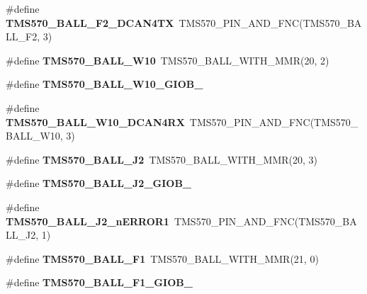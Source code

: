 \begin{DoxyCompactItemize}
\item 
\mbox{\label{tms570lc4357-pins_8h_a7022e9d881c8a7c5c00392f973da887c}} 
\#define {\bfseries T\+M\+S570\+\_\+\+B\+A\+L\+L\+\_\+\+F2\+\_\+\+D\+C\+A\+N4\+TX}~T\+M\+S570\+\_\+\+P\+I\+N\+\_\+\+A\+N\+D\+\_\+\+F\+NC(T\+M\+S570\+\_\+\+B\+A\+L\+L\+\_\+\+F2, 3)
\item 
\mbox{\label{tms570lc4357-pins_8h_af3fe649bd55fff8ad237671e7b23c7ab}} 
\#define {\bfseries T\+M\+S570\+\_\+\+B\+A\+L\+L\+\_\+\+W10}~T\+M\+S570\+\_\+\+B\+A\+L\+L\+\_\+\+W\+I\+T\+H\+\_\+\+M\+MR(20, 2)
\item 
\#define {\bfseries T\+M\+S570\+\_\+\+B\+A\+L\+L\+\_\+\+W10\+\_\+\+G\+I\+O\+B\+\_}
\item 
\mbox{\label{tms570lc4357-pins_8h_a6ebe5a0a27eb5fa7b3b431a7367dcf04}} 
\#define {\bfseries T\+M\+S570\+\_\+\+B\+A\+L\+L\+\_\+\+W10\+\_\+\+D\+C\+A\+N4\+RX}~T\+M\+S570\+\_\+\+P\+I\+N\+\_\+\+A\+N\+D\+\_\+\+F\+NC(T\+M\+S570\+\_\+\+B\+A\+L\+L\+\_\+\+W10, 3)
\item 
\mbox{\label{tms570lc4357-pins_8h_a6795de7f4a0a4d5d7bf0e71cacb3056b}} 
\#define {\bfseries T\+M\+S570\+\_\+\+B\+A\+L\+L\+\_\+\+J2}~T\+M\+S570\+\_\+\+B\+A\+L\+L\+\_\+\+W\+I\+T\+H\+\_\+\+M\+MR(20, 3)
\item 
\#define {\bfseries T\+M\+S570\+\_\+\+B\+A\+L\+L\+\_\+\+J2\+\_\+\+G\+I\+O\+B\+\_}
\item 
\mbox{\label{tms570lc4357-pins_8h_ae190d18219ce2903f74b9b3ad07661fd}} 
\#define {\bfseries T\+M\+S570\+\_\+\+B\+A\+L\+L\+\_\+\+J2\+\_\+n\+E\+R\+R\+O\+R1}~T\+M\+S570\+\_\+\+P\+I\+N\+\_\+\+A\+N\+D\+\_\+\+F\+NC(T\+M\+S570\+\_\+\+B\+A\+L\+L\+\_\+\+J2, 1)
\item 
\mbox{\label{tms570lc4357-pins_8h_a027403707d3ceff329ddffb923628d26}} 
\#define {\bfseries T\+M\+S570\+\_\+\+B\+A\+L\+L\+\_\+\+F1}~T\+M\+S570\+\_\+\+B\+A\+L\+L\+\_\+\+W\+I\+T\+H\+\_\+\+M\+MR(21, 0)
\item 
\#define {\bfseries T\+M\+S570\+\_\+\+B\+A\+L\+L\+\_\+\+F1\+\_\+\+G\+I\+O\+B\+\_}
\item 
\mbox{\label{tms570lc4357-pins_8h_ac3951e767c4599f6d01a71ab81d0f690}} 

\end{DoxyCompactItemize}
